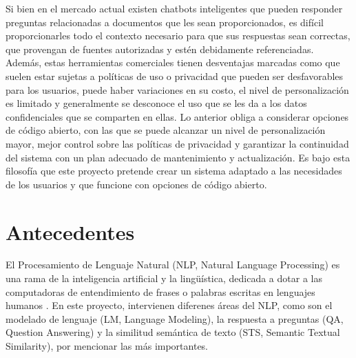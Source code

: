 Si bien en el mercado actual existen chatbots inteligentes que pueden
responder preguntas relacionadas a documentos que les sean proporcionados, es
difícil proporcionarles todo el contexto necesario para que sus respuestas sean
correctas, que provengan de fuentes autorizadas y estén debidamente
referenciadas. Además, estas herramientas comerciales tienen desventajas
marcadas como que suelen estar sujetas a políticas de uso o privacidad que pueden
ser desfavorables para los usuarios, puede haber variaciones
en su costo, el nivel de personalización es limitado y generalmente se desconoce
el uso que se les da a los datos confidenciales que se comparten en ellas. Lo anterior
obliga a considerar opciones de código abierto, con las que se puede alcanzar
un nivel de personalización mayor, mejor control sobre las políticas de privacidad
y garantizar la continuidad del sistema con un plan adecuado de mantenimiento
y actualización. Es bajo esta filosofía que este proyecto pretende crear un sistema
adaptado a las necesidades de los usuarios y que funcione con opciones de código
abierto.

\section{Antecedentes}

El Procesamiento de Lenguaje Natural (NLP, Natural Language Processing) es una rama
de la inteligencia artificial y la lingüística, dedicada a dotar a las computadoras
de entendimiento de frases o  palabras escritas en lenguajes humanos \cite{khurana_natural_2023}.
En este proyecto, intervienen diferenes áreas del NLP, como son el modelado de lenguaje
(LM, Language Modeling), la respuesta a preguntas (QA, Question Answering) y la
similitud semántica de texto (STS, Semantic Textual Similarity), por mencionar
las más importantes.

